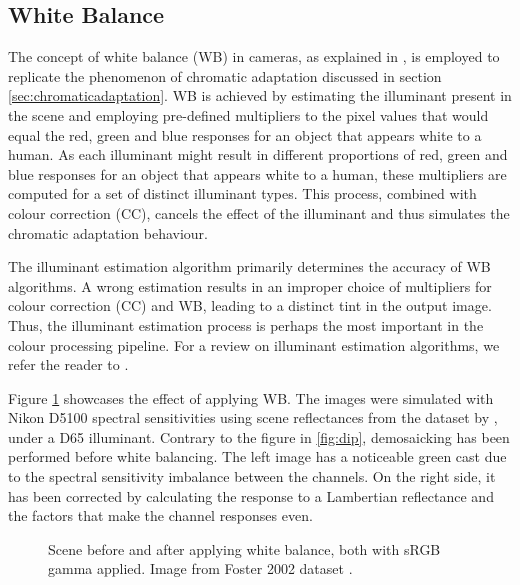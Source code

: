 \subsection{White Balance}
The concept of white balance (WB) in cameras, as explained in \cite[ch.~4.6]{rowlands2020physics}, is employed to replicate the phenomenon of chromatic adaptation discussed in section \ref{sec:chromaticadaptation}. WB is achieved by estimating the illuminant present in the scene and employing pre-defined multipliers to the pixel values that would equal the red, green and blue responses for an object that appears white to a human. As each illuminant might result in different proportions of red, green and blue responses for an object that appears white to a human, these multipliers are computed for a set of distinct illuminant types. This process, combined with colour correction (CC), cancels the effect of the illuminant and thus simulates the chromatic adaptation behaviour. 

The illuminant estimation algorithm primarily determines the accuracy of WB algorithms. A wrong estimation results in an improper choice of multipliers for colour correction (CC) and WB, leading to a distinct tint in the output image. Thus, the illuminant estimation process is perhaps the most important in the colour processing pipeline. For a review on illuminant estimation algorithms, we refer the reader to \cite{colourconstancy}.

Figure \ref{fig:wb} showcases the effect of applying WB. The images were simulated with Nikon D5100 spectral sensitivities \cite{D5100NPL} using scene reflectances from the dataset by \citeauthor{foster:2002} \cite{foster:2002}, under a D65 illuminant. Contrary to the figure in \ref{fig:dip}, demosaicking has been performed before white balancing. The left image has a noticeable green cast due to the spectral sensitivity imbalance between the channels. On the right side, it has been corrected by calculating the response to a Lambertian reflectance and the factors that make the channel responses even.

\begin{figure}
    \centering
    \caption{Scene before and after applying white balance, both with sRGB gamma applied. Image from Foster 2002 dataset \cite{foster:2002}. }
    \label{fig:wb}
\end{figure}

